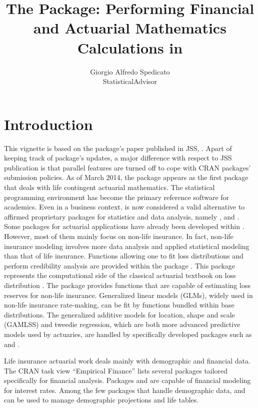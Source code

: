 \documentclass[nojss]{jss}
\author{Giorgio Alfredo Spedicato\\StatisticalAdvisor}
\title{The \pkg{lifecontingencies} Package: Performing Financial and Actuarial Mathematics Calculations in \proglang{R}}
\begin{document}
\maketitle

\section{Introduction}
This vignette is based on the package's paper published in JSS,
\cite{spedLifecon}. Apart of keeping track of package's updates, a major
difference with respect to JSS publication is that parallel features are turned
off to cope with CRAN packages' submission policies. As of March 2014, the
 package
\citep{spedLifecon} appears as the first  package that deals with life contingent actuarial mathematics. The 
statistical programming environment \citep{rSoftware} has become the
primary reference software for academics. Even in a business context,
 is now considered a valid alternative to affirmed
proprietary packages for statistics and data analysis, namely
 \citep{SAS},  \citep{MATLAB} and
 \citep{SPSS}. Some packages for actuarial applications
have already been developed within . However, most of them
mainly focus on non-life insurance. In fact, non-life insurance
modeling involves more data analysis and applied statistical modeling
than that of life insurance. Functions allowing one to fit loss
distributions and perform credibility analysis are provided within the
package  \citep{Dutang2008}. This package represents the
computational side of the classical actuarial textbook on loss
distribution \citep{klugman2009loss}. The package 
\citep{chainLadder} provides functions that are capable of estimating
loss reserves for non-life insurance. Generalized linear models
(GLMs), widely used in non-life insurance rate-making, can be fit by
functions bundled within base  distributions. The
generalized additive models for location, shape and scale (GAMLSS) and
tweedie regression, which are both more advanced predictive models
used by actuaries, are handled by specifically developed packages such
as  \citep{gamlssPkg,gamlsspkg2} and  \citep{cplmPkg}.

Life insurance actuarial work deals mainly with demographic and
financial data.  The CRAN task view ``Empirical Finance''
\citep{taskview} lists several packages tailored specifically for
financial analysis. Packages  \citep{YieldCurveR} and
 \citep{termstrcR} are capable of financial modeling for
interest rates. Among the few packages that handle demographic data,
 \citep{demographyR} and 
\citep{LifeTableR} can be used to manage demographic projections and
life tables.
\end{document}
